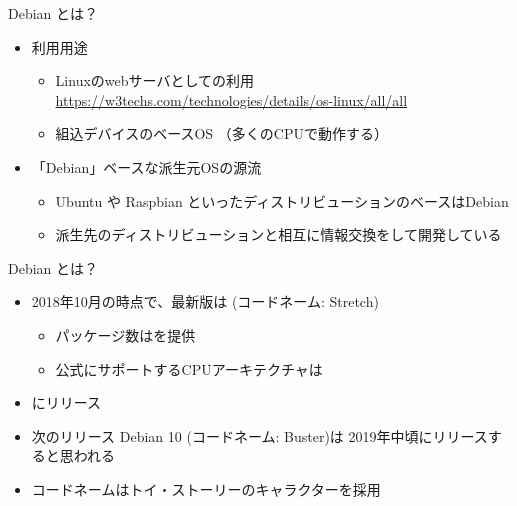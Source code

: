\documentclass[cjk,dvipdfmx,10pt,compress,%
hyperref={bookmarks=true,bookmarksnumbered=true,bookmarksopen=false,%
colorlinks=false,%
pdftitle={第 132 回 関西 Debian 勉強会},%
pdfauthor={かわだ},%
pdfsubject={資料},%
}]{beamer}
\begin{document}
\begin{frame}{Debian とは？}
\begin{itemize}
  \item 利用用途
  \begin{itemize}
    \item Linuxのwebサーバとしての利用 \url{https://w3techs.com/technologies/details/os-linux/all/all}
    \item 組込デバイスのベースOS （多くのCPUで動作する）
  \end{itemize}
  \item 「Debian」ベースな派生元OSの源流
  \begin{itemize}
    \item Ubuntu や Raspbian といったディストリビューションのベースはDebian
    \item 派生先のディストリビューションと相互に情報交換をして開発している
  \end{itemize}
\end{itemize}
\end{frame}

\begin{frame}{Debian とは？}
\begin{itemize}
  \item 2018年10月の時点で、最新版は {\color{red}{Debian 9.5}} (コードネーム: Stretch)
  \begin{itemize}
    \item パッケージ数は{\color{red}{約51000}}を提供
    \item 公式にサポートするCPUアーキテクチャは{\color{red}{10}}
  \end{itemize}
  \item {\color{red}{約2年毎}}にリリース
  \item 次のリリース Debian 10 (コードネーム: {\color{red}{}}Buster)は 2019年中頃にリリースすると思われる
  \item コードネームはトイ・ストーリーのキャラクターを採用
\end{itemize}
\end{frame}
\end{document}
